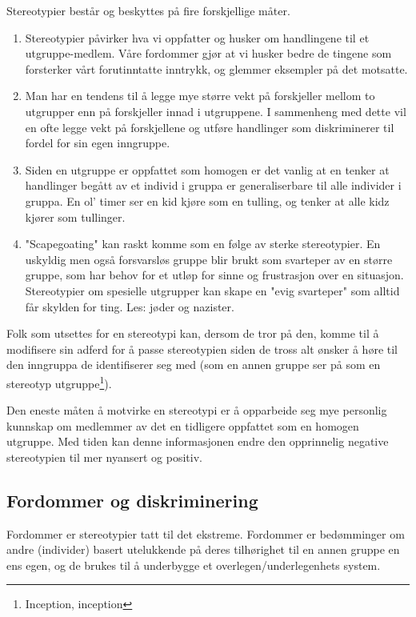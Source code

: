 \documentclass[11pt]{article}
\begin{document}
			Stereotypier består og beskyttes på fire forskjellige måter.
			\begin{enumerate}
				\item Stereotypier påvirker hva vi oppfatter og husker om handlingene til et utgruppe-medlem. Våre fordommer gjør at vi husker bedre de tingene som forsterker vårt forutinntatte inntrykk, og glemmer eksempler på det motsatte. 
				\item Man har en tendens til å legge mye større vekt på forskjeller mellom to utgrupper enn på forskjeller innad i utgruppene. I sammenheng med dette vil en ofte legge vekt på forskjellene og utføre handlinger som diskriminerer til fordel for sin egen inngruppe.
				\item Siden en utgruppe er oppfattet som homogen er det vanlig at en tenker at handlinger begått av et individ i gruppa er generaliserbare til alle individer i gruppa. En ol' timer ser en kid kjøre som en tulling, og tenker at alle kidz kjører som tullinger.
				\item "Scapegoating" kan raskt komme som en følge av sterke stereotypier. En uskyldig men også forsvarsløs gruppe blir brukt som svarteper av en større gruppe, som har behov for et utløp for sinne og frustrasjon over en situasjon. Stereotypier om spesielle utgrupper kan skape en "evig svarteper" som alltid får skylden for ting. Les: jøder og nazister.
			\end{enumerate}
			
			Folk som utsettes for en stereotypi kan, dersom de tror på den, komme til å modifisere sin adferd for å passe stereotypien siden de tross alt ønsker å høre til den inngruppa de identifiserer seg med (som en annen gruppe ser på som en stereotyp utgruppe\footnote{Inception, inception}).
			
			Den eneste måten å motvirke en stereotypi er å opparbeide seg mye personlig kunnskap om medlemmer av det en tidligere oppfattet som en homogen utgruppe. Med tiden kan denne informasjonen endre den opprinnelig negative stereotypien til mer nyansert og positiv.
			
		\subsection{Fordommer og diskriminering}
			Fordommer er stereotypier tatt til det ekstreme. Fordommer er bedømminger om andre (individer) basert utelukkende på deres tilhørighet til en annen gruppe en ens egen, og de brukes til å underbygge et overlegen/underlegenhets system.
			
\end{document}
